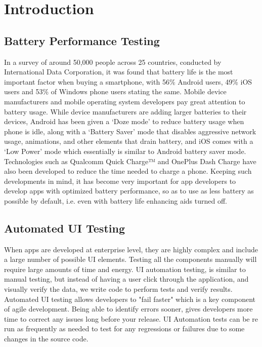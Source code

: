 
\chapter{Introduction}


\section{Battery Performance Testing}
In a survey of around 50,000 people across 25 countries, conducted by International Data Corporation, it was found that battery life is the most important factor when buying a smartphone, with 56\% Android users, 49\% iOS users and 53\% of Windows phone users stating the same.\cite{idcsurvey} Mobile device manufacturers and mobile operating system developers pay great attention to battery usage. While device manufacturers are adding larger batteries to their devices, Android has been given a ‘Doze mode’ to reduce battery usage when phone is idle, along with a ‘Battery Saver’ mode that disables aggressive network usage, animations, and other elements that drain battery, and iOS comes with a ‘Low Power’ mode which essentially is similar to Android battery saver mode. Technologies such as Qualcomm Quick Charge™ and OnePlus Dash Charge have also been developed to reduce the time needed to charge a phone. Keeping such developments in mind, it has become very important for app developers to develop apps with optimized battery performance, so as to use as less battery as possible by default, i.e. even with battery life enhancing aids turned off.

\section{Automated UI Testing}
When apps are developed at enterprise level, they are highly complex and include a large number of possible UI elements. Testing all the components manually will require large amounts of time and energy. UI automation testing, is similar to manual testing, but instead of having a user click through the application, and visually verify the data, we write code to perform tests and verify results. Automated UI testing allows developers to "fail faster" which is a key component of agile development. Being able to identify errors sooner, gives developers more time to correct any issues long before your release. UI Automation tests can be re run as frequently as needed to test for any regressions or failures due to some changes in the source code.


